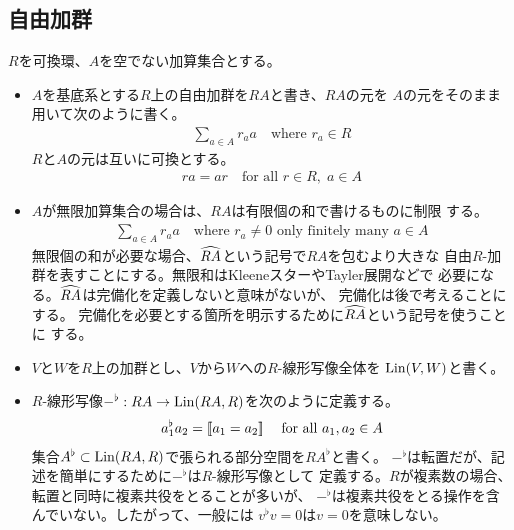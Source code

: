 {\subsection{自由加群}\label{s2:文法の線形化における自由加群} %
	$R$を可換環、$A$を空でない加算集合とする。
	\begin{itemize}\setlength{\itemsep}{-1mm} %
		\item $A$を基底系とする$R$上の自由加群を$RA$と書き、$RA$の元を
		$A$の元をそのまま用いて次のように書く。
		\begin{equation*}\begin{split}
			\sum_{a\in A} r_aa \quad\text{where } r_a\in R
		\end{split}\end{equation*}
		$R$と$A$の元は互いに可換とする。
		\begin{equation*}\begin{split}
			ra = ar \quad\text{for all } r\in R,\; a\in A
		\end{split}\end{equation*}
		\item $A$が無限加算集合の場合は、$RA$は有限個の和で書けるものに制限
		する。
		\begin{equation*}\begin{split}
			\sum_{a\in A} r_aa \quad\text{where } r_a\neq 0
			\text{ only finitely many } a\in A
		\end{split}\end{equation*}
		無限個の和が必要な場合、$\widehat{RA}$という記号で$RA$を包むより大きな
		自由$R$-加群を表すことにする。無限和はKleeneスターやTayler展開などで
		必要になる。$\widehat{RA}$は完備化を定義しないと意味がないが、
		完備化は後で考えることにする。
		完備化を必要とする箇所を明示するために$\widehat{RA}$という記号を使うことに
		する。
		\item $V$と$W$を$R$上の加群とし、$V$から$W$への$R$-線形写像全体を
		${\operatorname{Lin}}(V,W)$と書く。
		\item $R$-線形写像$-^\flat:RA\to{\ensuremath{\operatorname{Lin}}}(RA,R)$を次のように定義する。
		\begin{equation*}\begin{split}
			a_1^\flat a_2 = [\![a_1=a_2]\!]\; \quad\text{for all } a_1,a_2\in A
		\end{split}\end{equation*}
		集合$A^\flat\subset{\ensuremath{\operatorname{Lin}}}(RA,R)$で張られる部分空間を$RA^\flat$と書く。
		$-^\flat$は転置だが、記述を簡単にするために$-^\flat$は$R$-線形写像として
		定義する。$R$が複素数の場合、転置と同時に複素共役をとることが多いが、
		$-^\flat$は複素共役をとる操作を含んでいない。したがって、一般には
		$v^\flat v=0$は$v=0$を意味しない。
	\end{itemize} %

}
